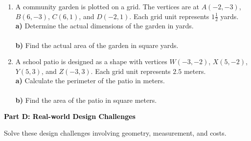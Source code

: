 \documentclass[12pt, letterpaper, fleqn]{article}
\newcommand{\blanklong}{\underline{\hspace{6.5cm}}}
\begin{document}
\begin{enumerate}[itemsep=2.5cm, leftmargin=0.6cm]
\item A community garden is plotted on a grid. The vertices are at $A(-2, -3)$, $B(6, -3)$, $C(6, 1)$, and $D(-2, 1)$. Each grid unit represents $1\frac{1}{2}$ yards. \\
\textbf{a)} Determine the actual dimensions of the garden in yards. \\
\blanklong \\
\textbf{b)} Find the actual area of the garden in square yards. \\
\blanklong

\item A school patio is designed as a shape with vertices $W(-3, -2)$, $X(5, -2)$, $Y(5, 3)$, and $Z(-3, 3)$. Each grid unit represents $2.5$ meters. \\
\textbf{a)} Calculate the perimeter of the patio in meters. \\
\blanklong \\
\textbf{b)} Find the area of the patio in square meters. \\
\blanklong
\end{enumerate}

\newpage

\begin{tcolorbox}[colback=black!10]
    \large\textcolor{black}{\textbf{Part D: Real-world Design Challenges}}
\end{tcolorbox}

\vspace{3mm}

\noindent
Solve these design challenges involving geometry, measurement, and costs.

\vspace{5mm}
\end{document}
